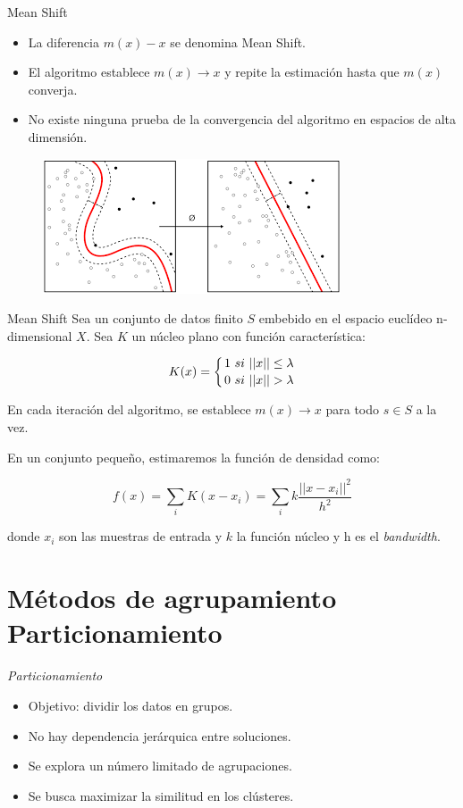 \documentclass[spanish]{beamer}
\begin{document}
\begin{frame}{Mean Shift}
\begin{itemize}
\item La diferencia $m(x)-x$ se denomina Mean Shift.\break

\item El algoritmo establece $m(x)\rightarrow x$ y repite la estimación hasta que $m(x)$ converja.\break

\item No existe ninguna prueba de la convergencia del algoritmo en espacios de alta dimensión.
\end{itemize}

\begin{figure}[h]
\centering
\includegraphics[scale=0.45]{dani/MS.png}
\end{figure}
\end{frame}

\begin{frame}{Mean Shift}
Sea un conjunto de datos finito $S$ embebido en el espacio euclídeo n-dimensional $X$. Sea $K$ un núcleo plano con función característica:

$$K(x)=\left\{
1 \ si \ ||x||\leq \lambda \atop
0 \ si \ ||x||> \lambda
\right.$$

En cada iteración del algoritmo, se establece $m(x)\rightarrow x$ para todo $s\in S$ a la vez.\break 

En un conjunto pequeño, estimaremos la función de densidad como:

$$f(x)=\sum_i K(x-x_i)=\sum_i k\dfrac{||x-x_i||^2}{h^2}$$

donde $x_i$ son las muestras de entrada y $k$ la función núcleo y h es el \textit{bandwidth}. 
\end{frame}

\section{Métodos de agrupamiento\\ Particionamiento}


\begin{frame}{\textit{Particionamiento}}
  \begin{itemize}
  \item Objetivo: dividir los datos en grupos.
  \item No hay dependencia jerárquica entre soluciones.
  \item Se explora un número limitado de agrupaciones.
  \item Se busca maximizar la similitud en los clústeres.
  \end{itemize}

\end{frame}
\end{document}
